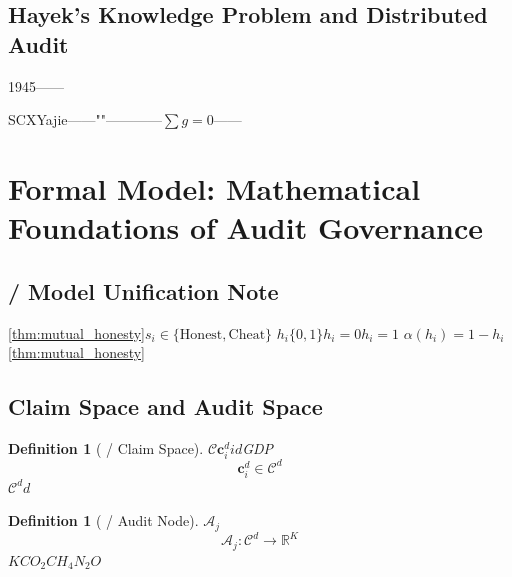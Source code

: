 \documentclass[12pt,a4paper]{article}
\newtheorem{definition}[theorem]{Definition}
\theoremstyle{remark}
\newcommand{\auditnode}{\mathcal{A}}
\begin{document}
\subsection{Hayek's Knowledge Problem and Distributed Audit}

1945——

SCXYajie——""\textbf{}————$\sum g = 0$——\textbf{}


\section{}
\section{Formal Model: Mathematical Foundations of Audit Governance}

\subsection{ / Model Unification Note}

\ref{thm:mutual_honesty}$s_i\in\{\text{Honest},\text{Cheat}\}$
$h_i$$\{0,1\}$$h_i=0$$h_i=1$
$\alpha(h_i)=1-h_i$\ref{thm:mutual_honesty}


\subsection{}
\subsection{Claim Space and Audit Space}

\begin{definition}[ / Claim Space]
    $\mathcal{C}$$\mathbf{c}_i^d$$i$$d$GDP
    \begin{equation}
        \mathbf{c}_i^d \in \mathcal{C}^d
    \end{equation}
    $\mathcal{C}^d$$d$
\end{definition}

\begin{definition}[ / Audit Node]
    $\auditnode_j$
    \begin{equation}
        \auditnode_j: \mathcal{C}^d \to \mathbb{R}^K
    \end{equation}
    $K$$CO_2$$CH_4$$N_2O$
\end{definition}
\end{document}
